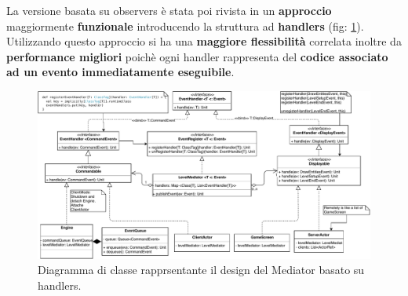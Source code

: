 La versione basata su observers è stata poi rivista in un \textbf{approccio} maggiormente \textbf{funzionale} introducendo la struttura ad \textbf{handlers} (fig: \ref{fig:mediatorHandler}). Utilizzando questo approccio si ha una \textbf{maggiore flessibilità} correlata inoltre da \textbf{performance migliori} poichè ogni handler rappresenta del \textbf{codice associato ad un evento immediatamente eseguibile}.
\begin{figure}[H]
	\centering
	\includegraphics[width=0.99\columnwidth]{drawio/mediator/mediatorHandler.pdf}
	\caption{Diagramma di classe rapprsentante il design del Mediator basato su handlers.}
	\label{fig:mediatorHandler}
\end{figure}